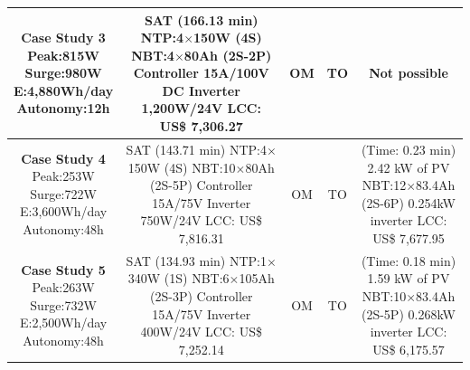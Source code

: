 \documentclass[runningheads]{llncs}
\begin{document}
\begin{table}[!t]
\begin{tabular}{|c|c|c|c|c|}
\hline
\makecell{\textbf{Case Study 3}\\Peak:815W\\Surge:980W\\E:4,880Wh/day\\Autonomy:12h} & \makecell {SAT (166.13 min) \\NTP:4$\times$150W (4S)\\NBT:4$\times$80Ah (2S-2P)\\Controller 15A/100V DC\\Inverter 1,200W/24V \\LCC: US\$ 7,306.27} & OM & TO & Not possible \\
\hline
\makecell{\textbf{Case Study 4}\\Peak:253W\\Surge:722W\\E:3,600Wh/day\\Autonomy:48h} &  \makecell {SAT (143.71 min) \\NTP:4$\times$150W (4S)\\NBT:10$\times$80Ah (2S-5P)\\Controller 15A/75V\\Inverter 750W/24V \\LCC: US\$ 7,816.31} & OM & TO & \makecell{(Time: 0.23 min)\\2.42 kW of PV\\NBT:12$\times$83.4Ah (2S-6P)\\0.254kW inverter\\LCC: US\$ 7,677.95}\\
\hline
\makecell{\textbf{Case Study 5}\\Peak:263W\\Surge:732W\\E:2,500Wh/day\\Autonomy:48h} &  \makecell {SAT (134.93 min) \\NTP:1$\times$340W (1S)\\NBT:6$\times$105Ah (2S-3P)\\Controller 15A/75V\\Inverter 400W/24V \\LCC: US\$ 7,252.14} & OM & TO & \makecell{(Time: 0.18 min)\\1.59 kW of PV\\NBT:10$\times$83.4Ah (2S-5P)\\0.268kW inverter\\LCC: US\$ 6,175.57} \\
\hline

\end{tabular}
\end{table}
\end{document}
